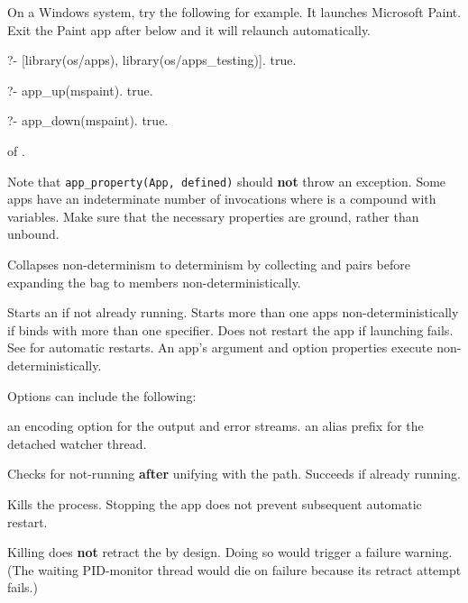 On a Windows system, try the following for example. It launches Microsoft Paint.
Exit the Paint app after  below and it will relaunch automatically.

\begin{code}
?- [library(os/apps), library(os/apps_testing)].
true.

?- app_up(mspaint).
true.

?- app_down(mspaint).
true.
\end{code}

\vspace{0.7cm}

\begin{description}
 of .

Note that \verb$app_property(App, defined)$ should \textbf{not} throw an
exception. Some apps have an indeterminate number of invocations
where  is a compound with variables. Make sure that the necessary
properties are ground, rather than unbound.

Collapses non-determinism to determinism by collecting  and
 pairs before expanding the bag to members
non-deterministically.

Starts an  if not already running. Starts more than one apps
non-deterministically if  binds with more than one specifier.
Does not restart the app if launching fails. See  for
automatic restarts. An app's argument and option properties execute
non-deterministically.

Options can include the following:

\begin{description}
an encoding option for the output and error streams.
an alias prefix for the detached watcher thread.
\end{description}

Checks for not-running \textbf{after} unifying with the  path. Succeeds
if already running.

Kills the  process. Stopping the app does not prevent subsequent
automatic restart.

Killing does \textbf{not} retract the  by design. Doing so would
trigger a failure warning. (The waiting PID-monitor thread would die
on failure because its retract attempt fails.)


\end{description}
